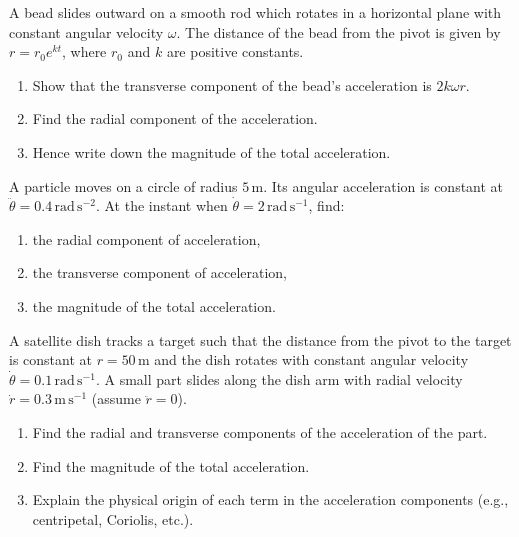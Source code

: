 \documentclass[11pt]{article}
\begin{document}
\begin{exercice}
A bead slides outward on a smooth rod which rotates in a horizontal plane with constant angular velocity $\omega$. The distance of the bead from the pivot is given by $r = r_0 e^{kt}$, where $r_0$ and $k$ are positive constants.
\begin{enumerate}
\item Show that the transverse component of the bead's acceleration is $2k\omega r$.
\item Find the radial component of the acceleration.
\item Hence write down the magnitude of the total acceleration.
\end{enumerate}
\end{exercice}

\begin{exercice}
A particle moves on a circle of radius $5\,\mathrm{m}$. Its angular acceleration is constant at $\ddot{\theta} = 0.4\,\mathrm{rad\,s^{-2}}$. At the instant when $\dot{\theta} = 2\,\mathrm{rad\,s^{-1}}$, find:
\begin{enumerate}
\item the radial component of acceleration,
\item the transverse component of acceleration,
\item the magnitude of the total acceleration.
\end{enumerate}
\end{exercice}

\begin{exercice}
A satellite dish tracks a target such that the distance from the pivot to the target is constant at $r = 50\,\mathrm{m}$ and the dish rotates with constant angular velocity $\dot{\theta} = 0.1\,\mathrm{rad\,s^{-1}}$. A small part slides along the dish arm with radial velocity $\dot{r} = 0.3\,\mathrm{m\,s^{-1}}$ (assume $\ddot{r} = 0$).
\begin{enumerate}
\item Find the radial and transverse components of the acceleration of the part.
\item Find the magnitude of the total acceleration.
\item Explain the physical origin of each term in the acceleration components (e.g., centripetal, Coriolis, etc.).
\end{enumerate}
\end{exercice}
\end{document}
